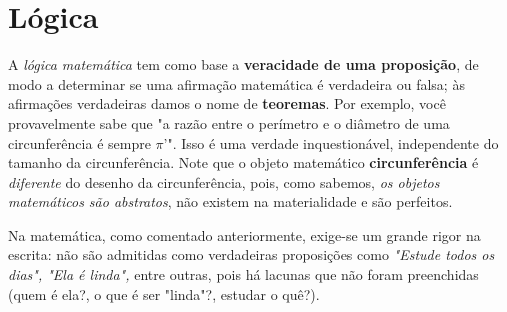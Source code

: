 \documentclass{article}
\begin{document}
\section{Lógica}

A \emph{lógica matemática} tem como base a \textbf{veracidade de uma proposição}, de modo a determinar se uma afirmação matemática é verdadeira ou falsa; às afirmações verdadeiras damos o nome de \textbf{teoremas}. Por exemplo, você provavelmente sabe que "a razão entre o perímetro e o diâmetro de uma circunferência é sempre $\pi$'". 
Isso é uma verdade inquestionável, independente do tamanho da circunferência. Note que o objeto matemático \textbf{circunferência} é \emph{diferente} do desenho da circunferência, pois, como sabemos, \emph{os objetos matemáticos são abstratos}, não existem na materialidade e são perfeitos.
\par
Na matemática, como comentado anteriormente, exige-se um grande rigor na escrita: não são admitidas como verdadeiras proposições como \emph{"Estude todos os dias", "Ela é linda",} entre outras, pois há lacunas que não foram preenchidas (quem é ela?, o que é ser "linda"?, estudar o quê?).
\end{document}
